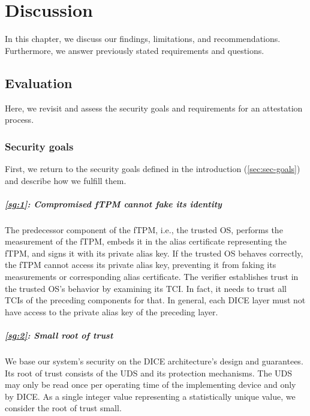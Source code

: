 
\chapter{Discussion}\label{chapter:discussion}

In this chapter, we discuss our findings, limitations, and recommendations.
Furthermore, we answer previously stated requirements and questions.

\section{Evaluation}

Here, we revisit and assess the security goals and requirements for an attestation process.


\subsection{Security goals}

First, we return to the security goals defined in the introduction (\autoref{sec:sec-goals}) and describe how we fulfill them.

\paragraph{\ref{sg:1}: Compromised fTPM cannot fake its identity}
The predecessor component of the fTPM, i.e., the trusted OS, performs the measurement of the fTPM, embeds it in the alias certificate representing the fTPM, and signs it with its private alias key.
If the trusted OS behaves correctly, the fTPM cannot access its private alias key, preventing it from faking its measurements or corresponding alias certificate.
The verifier establishes trust in the trusted OS's behavior by examining its \ac{TCI}\@.
In fact, it needs to trust all TCIs of the preceding components for that.
In general, each DICE layer must not have access to the private alias key of the preceding layer.

\paragraph{\ref{sg:2}: Small root of trust}
We base our system's security on the DICE architecture's design and guarantees.
Its root of trust consists of the \ac{UDS} and its protection mechanisms.
The \ac{UDS} may only be read once per operating time of the implementing device and only by DICE\@.
As a single integer value representing a statistically unique value, we consider the root of trust small.

